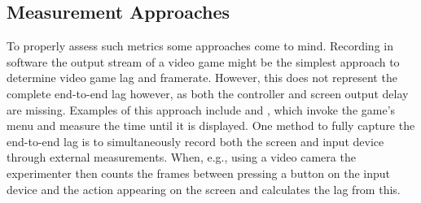 \subsection{Measurement Approaches}
\label{sec:measurementapproaches}

To properly assess such metrics some approaches come to mind. Recording in software the output stream of a video game might be the simplest approach to determine video game lag and framerate. However, this does not represent the complete end-to-end lag however, as both the controller and screen output delay are missing. Examples of this approach include \cite{Chen:2011:MLC:2072298.2071991} and \cite{6670099}, which invoke the game's menu and measure the time until it is displayed. One method to fully capture the end-to-end lag is to simultaneously record both the screen and input device through external measurements. When, e.g., using a video camera the experimenter then counts the frames between pressing a button on the input device and the action appearing on the screen and calculates the lag from this.





